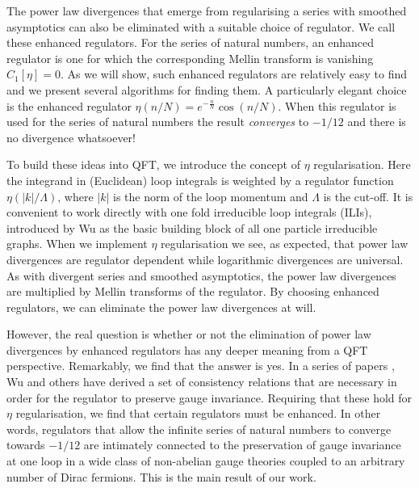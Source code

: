\documentclass[12pt, letter]{article}
\begin{document}
The power law divergences that emerge from regularising a series with smoothed asymptotics can also be eliminated with a suitable choice of regulator.  We call these enhanced regulators. For the series of natural numbers, an enhanced regulator is one for which the corresponding Mellin transform is vanishing $C_1[\eta]=0$. As we will show, such enhanced regulators are relatively easy to find and we present several algorithms for finding them.  A particularly elegant choice is the enhanced regulator $\eta(n/N)=e^{-\frac{n}{N}} \cos (n/N)$. When this regulator is used for the series of natural numbers the result {\it converges} to $-1/12$ and there is no divergence whatsoever!

To build these  ideas into QFT, we introduce the concept of $\eta$ regularisation. Here the integrand in (Euclidean) loop integrals is weighted by a regulator function $\eta(|k|/\Lambda)$, where $|k|$ is the norm of the loop momentum and $\Lambda$ is the cut-off.  It is convenient to work directly with  one fold irreducible loop integrals (ILIs), introduced by Wu \cite{Wu03} as the basic building block of all one particle  irreducible graphs.  When we implement $\eta$ regularisation we see, as expected, that power law divergences are regulator dependent while logarithmic divergences are universal.  As with divergent series and smoothed asymptotics, the power law divergences are multiplied by Mellin transforms of the regulator.  By choosing enhanced regulators, we can eliminate the power law divergences at will.  

However, the real question is whether or not the elimination of power law divergences by enhanced regulators has any deeper meaning from a QFT perspective.  Remarkably, we find that the answer is yes. In a series of papers \cite{Wu03,Wu04,Wu12,Wu13,Wu14,Wu17}, Wu and others have derived a set of consistency relations that are necessary in order for the regulator to preserve gauge invariance. Requiring that these hold for $\eta$ regularisation, we find that certain regulators must be enhanced.  In other words, regulators that allow the infinite series of natural numbers to converge towards $-1/12$ are intimately connected to the preservation of gauge invariance at one loop in a wide class of non-abelian gauge theories coupled to an arbitrary number of Dirac fermions.  This is the main result of our work. 
\end{document}
